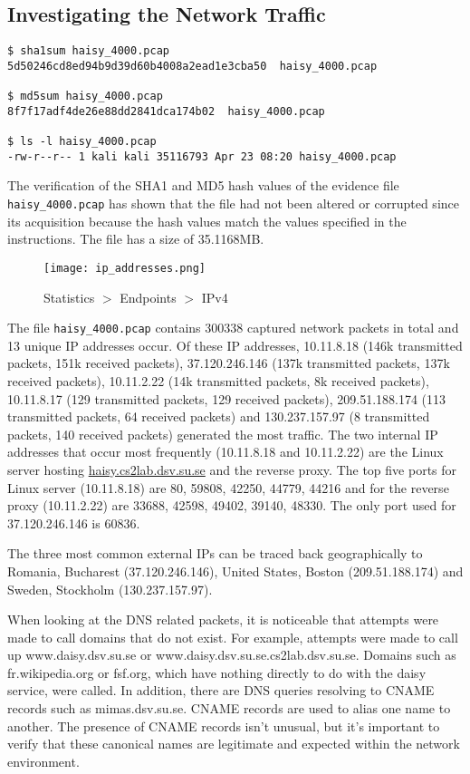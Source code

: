 \subsection{Investigating the Network Traffic}
\begin{verbatim}
$ sha1sum haisy_4000.pcap             
5d50246cd8ed94b9d39d60b4008a2ead1e3cba50  haisy_4000.pcap

$ md5sum haisy_4000.pcap 
8f7f17adf4de26e88dd2841dca174b02  haisy_4000.pcap

$ ls -l haisy_4000.pcap 
-rw-r--r-- 1 kali kali 35116793 Apr 23 08:20 haisy_4000.pcap
\end{verbatim}
The verification of the SHA1 and MD5 hash values of the evidence file \texttt{haisy\_4000.pcap} has shown that the file had not been altered or corrupted since its acquisition because the hash values match the values specified in the instructions. The file has a size of 35.1168MB.

\begin{figure}[h]
\texttt{[image: ip\_addresses.png]}
\centering
\caption{Statistics $>$ Endpoints $>$ IPv4}
\label{screen:ip_addresses}
\end{figure}

\noindent The file \texttt{haisy\_4000.pcap} contains 300338 captured network packets in total and 13 unique IP addresses occur. Of these IP addresses, 10.11.8.18 (146k transmitted packets, 151k received packets), 37.120.246.146 (137k transmitted packets, 137k received packets), 10.11.2.22 (14k transmitted packets, 8k received packets), 10.11.8.17 (129 transmitted packets, 129 received packets), 209.51.188.174 (113 transmitted packets, 64 received packets) and 130.237.157.97 (8 transmitted packets, 140 received packets) generated the most traffic. The two internal IP addresses that occur most frequently (10.11.8.18 and 10.11.2.22) are the Linux server hosting \url{haisy.cs2lab.dsv.su.se} and the reverse proxy. The top five ports for Linux server (10.11.8.18) are 80, 59808, 42250, 44779, 44216 and for the reverse proxy (10.11.2.22) are 33688, 42598, 49402, 39140, 48330. The only port used for 37.120.246.146 is 60836. 
\newline

\noindent The three most common external IPs can be traced back geographically to Romania, Bucharest (37.120.246.146), United States, Boston (209.51.188.174) and Sweden, Stockholm (130.237.157.97).
\newline

\noindent When looking at the DNS related packets, it is noticeable that attempts were made to call domains that do not exist. For example, attempts were made to call up www.daisy.dsv.su.se or www.daisy.dsv.su.se.cs2lab.dsv.su.se. Domains such as fr.wikipedia.org or fsf.org, which have nothing directly to do with the daisy service, were called. In addition, there are DNS queries resolving to CNAME records such as mimas.dsv.su.se. CNAME records are used to alias one name to another. The presence of CNAME records isn't unusual, but it's important to verify that these canonical names are legitimate and expected within the network environment.

